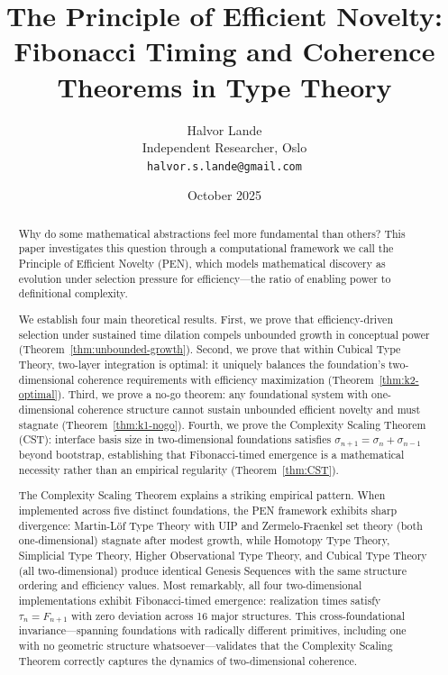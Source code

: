 \documentclass[11pt]{article}
\title{\textbf{The Principle of Efficient Novelty:\\ 
Fibonacci Timing and Coherence Theorems in Type Theory}}
\author{
Halvor Lande\\
Independent Researcher, Oslo\\
\texttt{halvor.s.lande@gmail.com}
}
\date{October 2025}
\theoremstyle{definition}
\theoremstyle{remark}
\begin{document}
\maketitle

\begin{abstract}

Why do some mathematical abstractions feel more fundamental than others? This paper
investigates this question through a computational framework we call the Principle of Efficient
Novelty (PEN), which models mathematical discovery as evolution under selection pressure for
efficiency---the ratio of enabling power to definitional complexity.

We establish four main theoretical results. First, we prove that efficiency-driven selection
under sustained time dilation compels unbounded growth in conceptual power (Theorem~\ref{thm:unbounded-growth}).
Second, we prove that within Cubical Type Theory, two-layer integration is optimal: it uniquely
balances the foundation's two-dimensional coherence requirements with efficiency maximization
(Theorem~\ref{thm:k2-optimal}). Third, we prove a no-go theorem: any foundational system with one-dimensional
coherence structure cannot sustain unbounded efficient novelty and must stagnate (Theorem~\ref{thm:k1-nogo}).
Fourth, we prove the Complexity Scaling Theorem (CST): interface basis size in two-dimensional
foundations satisfies $\sigma_{n+1} = \sigma_n + \sigma_{n-1}$ beyond bootstrap, establishing that
Fibonacci-timed emergence is a mathematical necessity rather than an empirical regularity
(Theorem~\ref{thm:CST}).

The Complexity Scaling Theorem explains a striking empirical pattern. When implemented
across five distinct foundations, the PEN framework exhibits sharp divergence: Martin-L\"of Type
Theory with UIP and Zermelo-Fraenkel set theory (both one-dimensional) stagnate after modest
growth, while Homotopy Type Theory, Simplicial Type Theory, Higher Observational Type Theory,
and Cubical Type Theory (all two-dimensional) produce identical Genesis Sequences with the same
structure ordering and efficiency values. Most remarkably, all four two-dimensional implementations
exhibit Fibonacci-timed emergence: realization times satisfy $\tau_n = F_{n+1}$ with zero deviation
across 16 major structures. This cross-foundational invariance---spanning foundations with radically
different primitives, including one with no geometric structure whatsoever---validates that the
Complexity Scaling Theorem correctly captures the dynamics of two-dimensional coherence.


\end{abstract}
\end{document}
